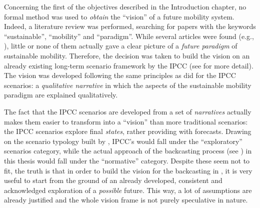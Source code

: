 Concerning the first of the objectives described in the Introduction chapter, no formal method was used to \emph{obtain} the ``vision'' of a future mobility system. Indeed, a literature review was performed, searching for papers with the keywords ``sustainable'', ``mobility'' and ``paradigm''. While several articles were found (e.g., \textcite{banister2008_sustainablemobilityparadigm}), little or none of them actually gave a clear picture of a \emph{future paradigm} of sustainable mobility. Therefore, the decision was taken to build the vision on an already existing long-term scenario framework by the \gls{IPCC} (see  for more detail). The vision was developed following the same principles as \textcite{oneill2017_roadsaheadNarratives} did for the IPCC scenarios: a \emph{qualitative narrative} in which the aspects of the sustainable mobility paradigm are explained qualitatively.

The fact that the IPCC scenarios are developed from a set of \emph{narratives} actually makes them easier to transform into a ``vision'' than more traditional scenarios: the IPCC scenarios explore final \emph{states}, rather providing with forecasts. Drawing on the scenario typology built by \textcite{boerjeson2006_Scenariotypestechniques}, IPCC's would fall under the ``exploratory'' scenarios category, while the actual approach of the backcasting process (see ) in this thesis would fall under the ``normative'' category. Despite these seem not to fit, the truth is that in order to build the vision for the backcasting in , it is very useful to start from the ground of an already developed, consistent and acknowledged exploration of a \emph{possible} future. This way, a lot of assumptions are already justified and the whole vision frame is not purely speculative in nature.
